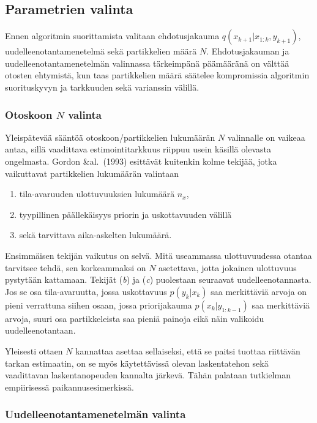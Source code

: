\documentclass[
  12pt,
  a4paper, twoside]{book}
\providecommand{\tightlist}{%
  \setlength{\itemsep}{0pt}\setlength{\parskip}{0pt}}
\begin{document}
\subsection{Parametrien valinta}

Ennen algoritmin suorittamista valitaan ehdotusjakauma \(q(x_{k+1}|x_{1:k},y_{k+1})\), uudelleenotantamenetelmä sekä partikkelien määrä \(N\). Ehdotusjakauman ja uudelleenotantamenetelmän valinnassa tärkeimpänä päämääränä on välttää otosten ehtymistä, kun taas partikkelien määrä säätelee kompromissia algoritmin suorituskyvyn ja tarkkuuden sekä varianssin välillä.

\subsubsection{Otoskoon $N$ valinta}

Yleispätevää sääntöä otoskoon/partikkelien lukumäärän \(N\) valinnalle on vaikeaa antaa, sillä vaadittava estimointitarkkuus riippuu usein käsillä olevasta ongelmasta. Gordon \&al.~(1993) \citep{Gordon-1993} esittävät kuitenkin kolme tekijää, jotka vaikuttavat partikkelien lukumäärän valintaan

\begin{enumerate}
\def\labelenumi{\alph{enumi}.}
\tightlist
\item
  tila-avaruuden ulottuvuuksien lukumäärä \({n_x}\),
\item
  tyypillinen päällekäisyys priorin ja uskottavuuden välillä
\item
  sekä tarvittava aika-askelten lukumäärä.
\end{enumerate}

Ensimmäisen tekijän vaikutus on selvä. Mitä useammassa ulottuvuudessa otantaa tarvitsee tehdä, sen korkeammaksi on \(N\) asetettava, jotta jokainen ulottuvuus pystytään kattamaan. Tekijät (\textit{b}) ja (\textit{c}) puolestaan seuraavat uudelleenotannasta. Jos se osa tila-avaruutta, jossa uskottavuus \(p(y_k|x_k)\) saa merkittäviä arvoja on pieni verrattuna siihen osaan, jossa priorijakauma \(p(x_k|y_{1:k-1})\) saa merkittäviä arvoja, suuri osa partikkeleista saa pieniä painoja eikä näin valikoidu uudelleenotantaan.

Yleisesti ottaen \(N\) kannattaa asettaa sellaiseksi, että se paitsi tuottaa riittävän tarkan estimaatin, on se myös käytettävissä olevan laskentatehon sekä vaadittavan laskentanopeuden kannalta järkevä. Tähän palataan tutkielman empiirisessä paikannusesimerkissä.

\subsubsection{Uudelleenotantamenetelmän valinta}
\end{document}

